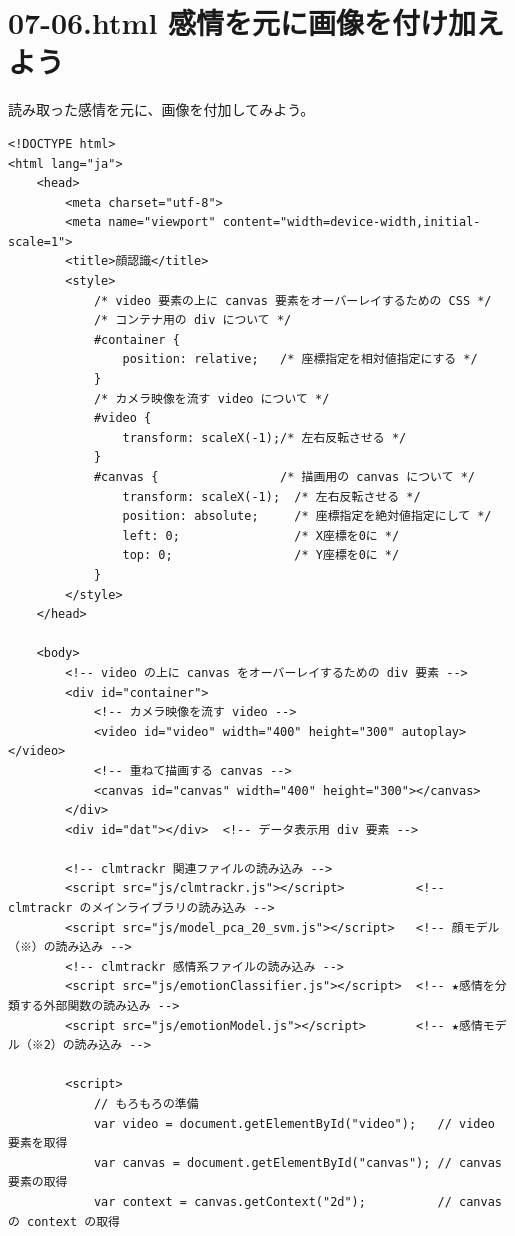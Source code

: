 \documentclass[mingoth,11pt,a4j,uplatex]{jsarticle}
\begin{document}
\newpage
\section{07-06.html 感情を元に画像を付け加えよう}
読み取った感情を元に、画像を付加してみよう。

\begin{lstlisting}[caption=07-06.html]
<!DOCTYPE html>
<html lang="ja">
    <head>
        <meta charset="utf-8">
        <meta name="viewport" content="width=device-width,initial-scale=1">
        <title>顔認識</title>
        <style>
            /* video 要素の上に canvas 要素をオーバーレイするための CSS */
            /* コンテナ用の div について */
            #container {              
                position: relative;   /* 座標指定を相対値指定にする */
            }
            /* カメラ映像を流す video について */
            #video {                  
                transform: scaleX(-1);/* 左右反転させる */
            }
            #canvas {                 /* 描画用の canvas について */
                transform: scaleX(-1);  /* 左右反転させる */
                position: absolute;     /* 座標指定を絶対値指定にして */
                left: 0;                /* X座標を0に */
                top: 0;                 /* Y座標を0に */
            }
        </style>
    </head>

    <body>
        <!-- video の上に canvas をオーバーレイするための div 要素 -->
        <div id="container">  
            <!-- カメラ映像を流す video -->
            <video id="video" width="400" height="300" autoplay></video>
            <!-- 重ねて描画する canvas -->
            <canvas id="canvas" width="400" height="300"></canvas>        
        </div>
        <div id="dat"></div>  <!-- データ表示用 div 要素 -->
        
        <!-- clmtrackr 関連ファイルの読み込み -->
        <script src="js/clmtrackr.js"></script>          <!-- clmtrackr のメインライブラリの読み込み -->
        <script src="js/model_pca_20_svm.js"></script>   <!-- 顔モデル（※）の読み込み -->
        <!-- clmtrackr 感情系ファイルの読み込み -->
        <script src="js/emotionClassifier.js"></script>  <!-- ★感情を分類する外部関数の読み込み -->
        <script src="js/emotionModel.js"></script>       <!-- ★感情モデル（※2）の読み込み -->
        
        <script>
            // もろもろの準備
            var video = document.getElementById("video");   // video 要素を取得
            var canvas = document.getElementById("canvas"); // canvas 要素の取得
            var context = canvas.getContext("2d");          // canvas の context の取得
            

\end{lstlisting}
\end{document}
